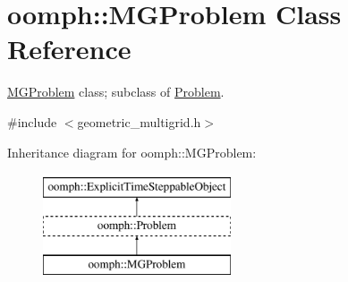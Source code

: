 \hypertarget{classoomph_1_1MGProblem}{}\section{oomph\+:\+:M\+G\+Problem Class Reference}
\label{classoomph_1_1MGProblem}


\hyperlink{classoomph_1_1MGProblem}{M\+G\+Problem} class; subclass of \hyperlink{classoomph_1_1Problem}{Problem}.  




{\ttfamily \#include $<$geometric\+\_\+multigrid.\+h$>$}

Inheritance diagram for oomph\+:\+:M\+G\+Problem\+:\begin{figure}[H]
\begin{center}
\leavevmode
\includegraphics[height=3.000000cm]{classoomph_1_1MGProblem}
\end{center}
\end{figure}
